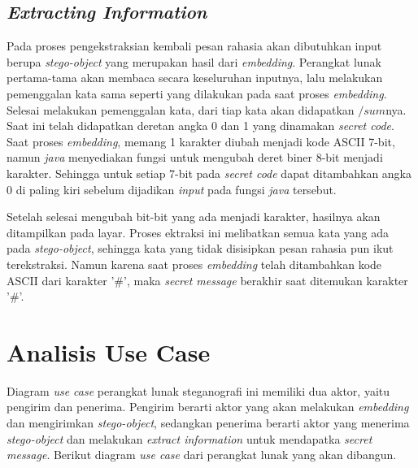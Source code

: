 \subsection{\textit{Extracting Information}}
Pada proses pengekstraksian kembali pesan rahasia akan dibutuhkan input berupa \textit{stego-object} yang merupakan hasil dari \textit{embedding}. Perangkat lunak pertama-tama akan membaca secara keseluruhan inputnya, lalu melakukan pemenggalan kata sama seperti yang dilakukan pada saat proses \textit{embedding}. Selesai melakukan pemenggalan kata, dari tiap kata akan didapatkan $/sum$nya. Saat ini telah didapatkan deretan angka 0 dan 1 yang dinamakan \textit{secret code}. Saat proses \textit{embedding}, memang 1 karakter diubah menjadi kode ASCII 7-bit, namun \textit{java} menyediakan fungsi untuk mengubah deret biner 8-bit menjadi karakter. Sehingga untuk setiap 7-bit pada \textit{secret code} dapat ditambahkan angka 0 di paling kiri sebelum dijadikan \textit{input} pada fungsi \textit{java} tersebut.

Setelah selesai mengubah bit-bit yang ada menjadi karakter, hasilnya akan ditampilkan pada layar. Proses ektraksi ini melibatkan semua kata yang ada pada \textit{stego-object}, sehingga kata yang tidak disisipkan pesan rahasia pun ikut terekstraksi. Namun karena saat proses \textit{embedding} telah ditambahkan kode ASCII dari karakter '\#', maka \textit{secret message} berakhir saat ditemukan karakter '\#'. 

\section{Analisis Use Case}

Diagram \textit{use case} perangkat lunak steganografi ini memiliki dua aktor, yaitu pengirim dan penerima. Pengirim berarti aktor yang akan melakukan \textit{embedding} dan mengirimkan \textit{stego-object}, sedangkan penerima berarti aktor yang menerima \textit{stego-object} dan melakukan \textit{extract information} untuk mendapatka \textit{secret message}. Berikut diagram \textit{use case} dari perangkat lunak yang akan dibangun.

